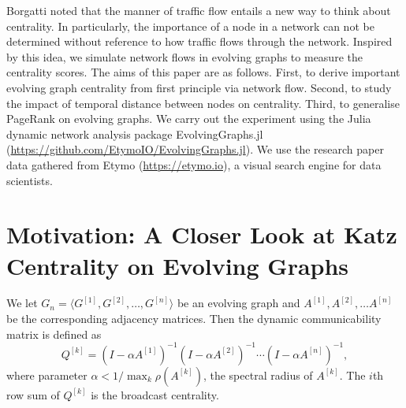 \documentclass[12pt]{article}
\theoremstyle{definition}
\begin{document}


Borgatti \cite{borgatti05} noted that the manner of traffic flow entails a new way to think about centrality. In particularly, the importance of a node in a network can not be determined without reference to how traffic flows through the network.
Inspired by this idea, we simulate network flows in evolving graphs to measure the centrality scores.
The aims of this paper are as follows. First, to derive important evolving graph centrality from first principle via network flow. Second, to study the impact of temporal distance between nodes on centrality.
Third, to generalise PageRank on evolving graphs.
We carry out the experiment using the Julia dynamic network analysis package
EvolvingGraphs.jl (\url{https://github.com/EtymoIO/EvolvingGraphs.jl}).
We use the research paper data gathered from Etymo (\url{https://etymo.io}), a visual search engine for data scientists.


\section{Motivation: A Closer Look at Katz Centrality on Evolving Graphs}
\label{sec:motivation}

We let $G_n = \langle G^{[1]}, G^{[2]}, \ldots, G^{[n]} \rangle$ be an evolving graph
and $A^{[1]}, A^{[2]}, \dots A^{[n]}$ be the corresponding adjacency matrices.
Then the dynamic communicability matrix is defined as
\begin{equation}
  \label{eq:q}
  Q^{[k]} = (I - \alpha A^{[1]})^{-1}(I - \alpha A^{[2]})^{-1} \cdots (I -  \alpha A^{[n]})^{-1},
\end{equation}
where parameter $\alpha < 1/ \max_k \rho(A^{[k]})$, the spectral radius of $A^{[k]}$.
The $i$th row sum of $Q^{[k]}$ is the broadcast centrality.
\end{document}
